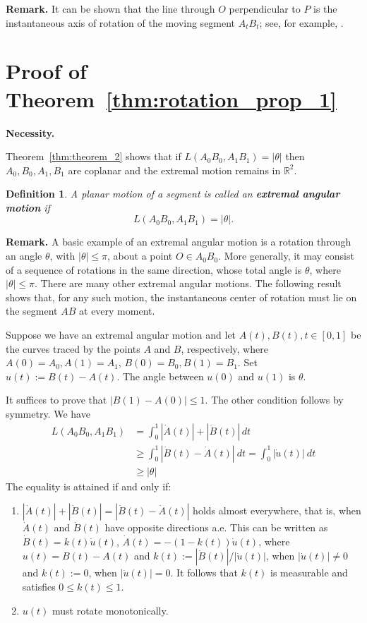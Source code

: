 \documentclass[a4paper,12pt,reqno]{amsart}
\newtheorem*{definition}{Definition}
\begin{document}
\smallskip
\noindent \textbf{Remark.} It can be shown that the line through \(O\) perpendicular to $P$ is the instantaneous axis of rotation of the moving segment $A_tB_t$; see, for example, \cite{Bo_Roth_1990}.

\section{Proof of Theorem~\ref{thm:rotation_prop_1}}

\noindent \textbf{Necessity.}

Theorem~\ref{thm:theorem_2} shows that if $L(A_0B_0,A_1B_1)=|\theta|$ then $A_0,B_0,A_1,B_1$ are coplanar and the extremal motion remains in $\mathbb{R}^2$.

\begin{definition}
A planar motion of a segment is called an \textbf{extremal angular motion} if
\[
L(A_0B_0,A_1B_1)=|\theta|.
\]
\end{definition}
\noindent 
\textbf{Remark.} A basic example of an extremal angular motion is a rotation through an angle
\(\theta\), with \(|\theta|\le\pi\), about a point \(O\in A_0B_0\).
More generally, it may consist of a sequence of rotations in the same direction,
whose total angle is \(\theta\), where \(|\theta|\le\pi\).
There are many other extremal angular motions. The following result shows that,
for any such motion, the instantaneous center of rotation must lie on the
segment \(AB\) at every moment.

\smallskip
Suppose we have an extremal angular motion and let $A(t), B(t),t\in[0,1]$ be the curves traced by the points $A$ and $B$, respectively, where $A(0)=A_0, A(1)=A_1$, $B(0)=B_0, B(1)=B_1$. Set $u(t):=B(t)-A(t)$. The angle between $u(0)$ and $u(1)$ is $\theta$. 

It suffices to prove that $|B(1)-A(0)|\le 1$. The other condition follows by symmetry. We have
\begin{align*}
    L(A_0B_0, A_1B_1) &= \int_0^1|\dot{A}(t)|+|\dot{B}(t)|\,dt \\
    &\ge \int_0^1 |\dot{B}(t)-\dot{A}(t)|\ dt = \int_0^1 |\dot{u}(t)|\ dt \\
    &\ge |\theta|  
\end{align*}
The equality is attained if and only if: 
\begin{enumerate}
 \item 
 $|\dot{A}(t)|+|\dot{B}(t)|=|\dot{B}(t)-\dot{A}(t)|$ holds almost everywhere, that is, when $\dot{A}(t)$ and $\dot{B}(t)$ have opposite directions a.e. This can be written as $\dot{B}(t)= k(t)\dot{u}(t)$, $\dot{A}(t)=-(1-k(t))\dot{u}(t)$, where $u(t)=B(t)-A(t)$ and $\displaystyle k(t):=|\dot{B}(t)|/|\dot{u}(t)|$, when $\left| \dot{u}(t)\right|\ne 0$ and $k(t):=0$, when $\left| \dot{u}(t)\right|=0$. It follows that $k(t)$ is measurable and satisfies $0\le k(t)\le 1$. \\
\item  
$u(t)$ must rotate monotonically. 
\end{enumerate}
\end{document}
